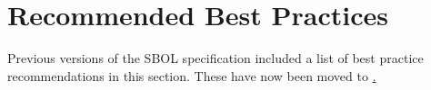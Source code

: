 \section{Recommended Best Practices}
\label{sec:bestpractices}

Previous versions of the SBOL specification included a list of best practice recommendations in this section.
These have now been moved to \href{https://github.com/SynBioDex/SBOL-examples/tree/main/SBOL/best-practices}.
